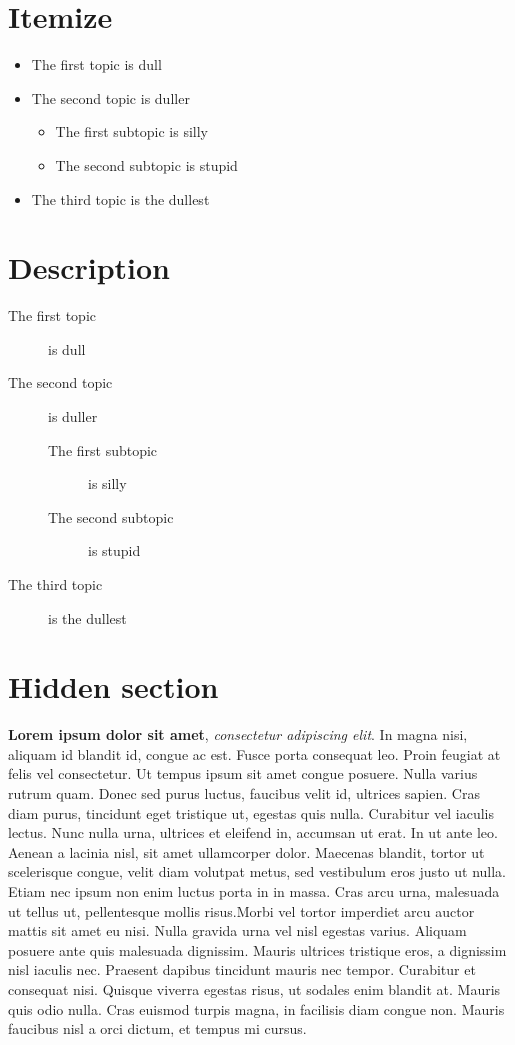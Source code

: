 \section*{Itemize}
\begin{itemize}
\item The first topic is dull
\item The second topic is duller
\begin{itemize}
\item The first subtopic is silly
\item The second subtopic is stupid
\end{itemize}
\item The third topic is the dullest
\end{itemize}

\section*{Description}
\begin{description}
\item[The first topic] is dull
\item[The second topic] is duller
\begin{description}
\item[The first subtopic] is silly
\item[The second subtopic] is stupid
\end{description}
\item[The third topic] is the dullest
\end{description}


\clearpage

\tochide\section{Hidden section}
\textbf{Lorem ipsum dolor sit amet}, \textit{consectetur adipiscing elit}. In magna
nisi, aliquam id blandit id, congue ac est. Fusce porta consequat leo. Proin
feugiat at felis vel consectetur. Ut tempus ipsum sit amet congue posuere.
Nulla varius rutrum quam. Donec sed purus luctus, faucibus velit id, ultrices sapien.
Cras diam purus, tincidunt eget tristique ut, egestas quis nulla. Curabitur vel
iaculis lectus. Nunc nulla urna, ultrices et eleifend in, accumsan ut erat.
In ut ante leo. Aenean a lacinia nisl, sit amet ullamcorper dolor. Maecenas
blandit, tortor ut scelerisque congue, velit diam volutpat metus, sed vestibulum
eros justo ut nulla. Etiam nec ipsum non enim luctus porta in in massa.
Cras arcu urna, malesuada ut tellus ut, pellentesque mollis risus.Morbi vel
tortor imperdiet arcu auctor mattis sit amet eu nisi. Nulla gravida urna vel
nisl egestas varius. Aliquam posuere ante quis malesuada dignissim. Mauris
ultrices tristique eros, a dignissim nisl iaculis nec. Praesent dapibus tincidunt
mauris nec tempor. Curabitur et consequat nisi. Quisque viverra egestas risus,
ut sodales enim blandit at. Mauris quis odio nulla. Cras euismod turpis magna,
in facilisis diam congue non. Mauris faucibus nisl a orci dictum, et tempus mi
cursus.

